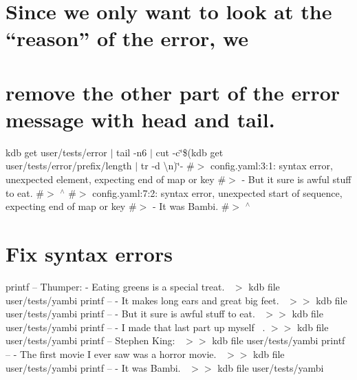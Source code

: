 \section*{Since we only want to look at the “reason” of the error, we}

\section*{remove the other part of the error message with {\ttfamily head} and {\ttfamily tail}.}

kdb get user/tests/error $\vert$ tail -\/n6 $\vert$ cut -\/c\char`\"{}\$(kdb get user/tests/error/prefix/length $\vert$ tr -\/d \textquotesingle{}\textbackslash{}n\textquotesingle{})\char`\"{}-\/ \#$>$ config.\+yaml\+:3\+:1\+: syntax error, unexpected element, expecting end of map or key \#$>$ -\/ But it sure is awful stuff to eat. \#$>$ $^\wedge$ \#$>$ config.\+yaml\+:7\+:2\+: syntax error, unexpected start of sequence, expecting end of map or key \#$>$ -\/ It was Bambi. \#$>$ $^\wedge$

\section*{Fix syntax errors}

printf -- \textquotesingle{}Thumper\+: -\/ Eating greens is a special treat.~\newline
\textquotesingle{} $>$ {\ttfamily kdb file user/tests/yambi} printf -- \textquotesingle{} -\/ It makes long ears and great big feet.~\newline
\textquotesingle{} $>$$>$ {\ttfamily kdb file user/tests/yambi} printf -- \textquotesingle{} -\/ But it sure is awful stuff to eat.~\newline
\textquotesingle{} $>$$>$ {\ttfamily kdb file user/tests/yambi} printf -- \textquotesingle{} -\/ I made that last part up myself~\newline
.\textquotesingle{} $>$$>$ {\ttfamily kdb file user/tests/yambi} printf -- \textquotesingle{}Stephen King\+:~\newline
\textquotesingle{} $>$$>$ {\ttfamily kdb file user/tests/yambi} printf -- \textquotesingle{} -\/ The first movie I ever saw was a horror movie.~\newline
\textquotesingle{} $>$$>$ {\ttfamily kdb file user/tests/yambi} printf -- \textquotesingle{} -\/ It was Bambi.~\newline
\textquotesingle{} $>$$>$ {\ttfamily kdb file user/tests/yambi}

